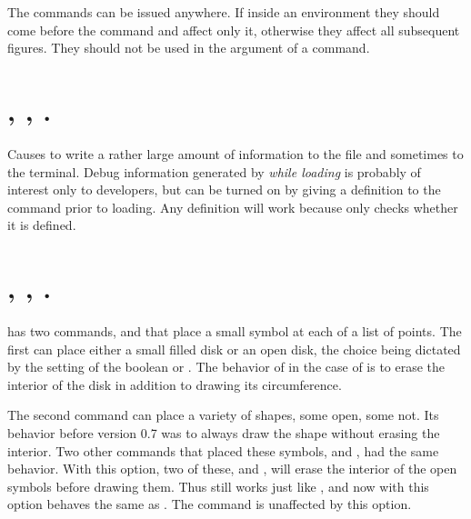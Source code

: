 \documentclass[letterpaper]{article}
\begin{document}
The commands can be issued anywhere. If inside an 
environment they should come before the  command and affect
only it, otherwise they affect all subsequent figures. They should not
be used in the argument of a  command.

\section{, ,
.}\label{debug}
%
%

Causes \mfp{} to write a rather large amount of information to the
 file and sometimes to the terminal. Debug information
generated by  \emph{while loading} is probably of
interest only to developers, but can be turned on by giving a definition
to the command  prior to loading. Any definition will
work because  only checks whether it is defined.

\section{, , .}
%
%

\Mfp{} has two commands,  and  that place a
small symbol at each of a list of points. The first can place either a
small filled disk or an open disk, the choice being dictated by the
setting of the boolean  or . The
behavior of  in the case of  is to erase the
interior of the disk in addition to drawing its circumference.

The second command  can place a variety of shapes, some
open, some not. Its behavior before version 0.7 was to always draw the
shape without erasing the interior. Two other commands that placed these
symbols,  and , had the same behavior. With this
option, two of these,  and , will erase the
interior of the open symbols before drawing them. Thus
 still works just like
, and now with this option
 behaves the same as
. The  command is unaffected by
this option.
\end{document}
